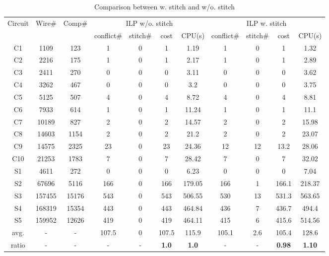 \documentclass[12pt]{spieman}
\theoremstyle{plain}
\begin{document}
\begin{spacing}{1}
\begin{table*}[htb]
\centering
\renewcommand{\arraystretch}{0.9}
\caption{Comparison between w. stitch and w/o. stitch}
\label{tab:tplec_stitch}
\resizebox{16.4cm}{!} {
\begin{tabular}{|c|c|c |c|c|c|c||c|c|c|c||}
  \hline \hline
  \multirow{2}{*}{Circuit} &\multirow{2}{*}{Wire\#}  &\multirow{2}{*}{Comp\#} &\multicolumn{4}{c||}{ILP w/o. stitch} & \multicolumn{4}{c|}{ILP w. stitch}\\
  \cline{4-11} &        &         &conflict\# &stitch\#  & cost & CPU(s)        &conflict\#    &stitch\#      &cost  & CPU(s) \\
  \hline
 C1           &1109    &123        &1     &0    &1       &1.19       &1       &0     &1       &1.32   \\ 
 C2           &2216    &175        &1     &0    &1       &2.17       &1       &0     &1       &2.89   \\  
 C3           &2411    &270        &0     &0    &0       &3.11       &0       &0     &0       &3.62   \\  
 C4           &3262    &467        &0     &0    &0       &3.2        &0       &0     &0       &3.75   \\   
 C5           &5125    &507        &4     &0    &4       &8.72       &4       &0     &4       &8.81   \\  
 C6           &7933    &614        &1     &0    &1       &11.24      &1       &0     &1       &11.1   \\ 
 C7           &10189   &827        &2     &0    &2       &14.57      &2       &0     &2       &15.98  \\   
 C8           &14603   &1154       &2     &0    &2       &21.2       &2       &0     &2       &23.07  \\  
 C9           &14575   &2325       &23    &0    &23      &24.36      &12      &12    &13.2    &28.06  \\   
 C10          &21253   &1783       &7     &0    &7       &28.42      &7       &0     &7       &32.02  \\    
 S1           &4611    &272        &0     &0    &0       &6.23       &0       &0     &0       &7.04   \\   
 S2           &67696   &5116       &166   &0    &166     &179.05     &166     &1     &166.1   &218.37 \\    
 S3           &157455  &15176      &543   &0    &543     &506.55     &530     &13    &531.3   &563.65 \\    
 S4           &168319  &15354      &443   &0    &443     &464.84     &436     &7     &436.7   &494.4  \\   
 S5           &159952  &12626      &419   &0    &419     &464.11     &415     &6     &415.6   &514.56 \\    
 \hline
 avg.         &-       &-          &107.5 &0    &107.5   &115.9      &105.1   &2.6   &105.4   &128.6  \\  
 \hline
 ratio        &-       &-          &-	    &-    &\textbf{1.0}   &\textbf{1.0}
                                   &-     &-    &\textbf{0.98}  &\textbf{1.10}\\


\end{tabular}}
\end{table*}
\end{spacing}
\end{document}
